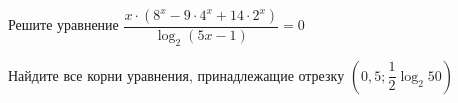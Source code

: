 \begin{ex}
	\begin{condition}
		\begin{enumcols}[label=\asbuk*)]
			\item Решите уравнение \( \dfrac{x\cdot(8^x - 9\cdot4^x + 14\cdot2^x)}{\log_2 (5x - 1)}=0 \)
			\item Найдите все корни уравнения, принадлежащие отрезку \( \left(0,5;\dfrac{1}{2}\log_2 50\right) \)
		\end{enumcols}
	\end{condition}
\end{ex}
